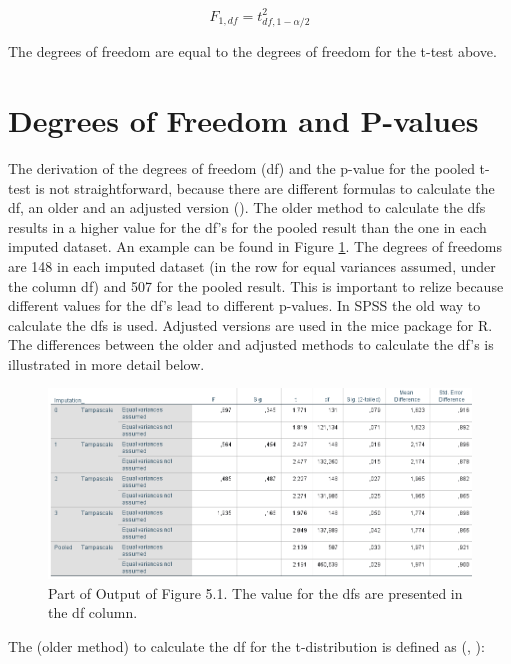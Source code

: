 \documentclass[]{book}
\begin{document}
\begin{equation}
F_{1, df}=t^2_{df,1-\alpha/2}
  \label{eq:f-distr}
\end{equation}

The degrees of freedom are equal to the degrees of freedom for the
t-test above.

\section{Degrees of Freedom and
P-values}\label{degrees-of-freedom-and-p-values}

The derivation of the degrees of freedom (df) and the p-value for the
pooled t-test is not straightforward, because there are different
formulas to calculate the df, an older and an adjusted version
(\citet{VanBuuren2018}). The older method to calculate the dfs results
in a higher value for the df's for the pooled result than the one in
each imputed dataset. An example can be found in Figure
\ref{fig:tab9-3}. The degrees of freedoms are 148 in each imputed
dataset (in the row for equal variances assumed, under the column df)
and 507 for the pooled result. This is important to relize because
different values for the df's lead to different p-values. In SPSS the
old way to calculate the dfs is used. Adjusted versions are used in the
mice package for R. The differences between the older and adjusted
methods to calculate the df's is illustrated in more detail below.

\begin{figure}

{\centering \includegraphics[width=0.9\linewidth]{images/table5.2} 

}

\caption{Part of Output of Figure 5.1. The value for the dfs are presented in the df column.}\label{fig:tab9-3}
\end{figure}

The (older method) to calculate the df for the t-distribution is defined
as (\citet{rubin1987}, \citet{VanBuuren2018}):
\end{document}
